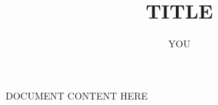 \documentclass{article}
\title{TITLE}
\author{YOU}
\begin{document}
\maketitle

DOCUMENT CONTENT HERE

\end{document}
